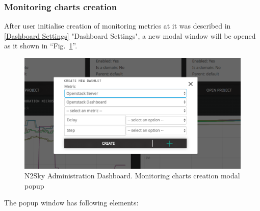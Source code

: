 \subsubsection{Monitoring charts creation}\label{Monitoring charts creation}

After user initialise creation of monitoring metrics at it was described in \autoref{Dashboard Settings} "Dashboard Settings", a new modal window will be opened as it shown in ``Fig.~\ref{fig:create_monitoring}''.

\begin{figure}[htbp]
\begin{center}
  \includegraphics[width=\linewidth]{components/4/pics/create_monitoring.png}
  \caption{N2Sky Administration Dashboard. Monitoring charts creation modal popup}
  \label{fig:create_monitoring}
\end{center}
\end{figure}

The popup window has following elements:

